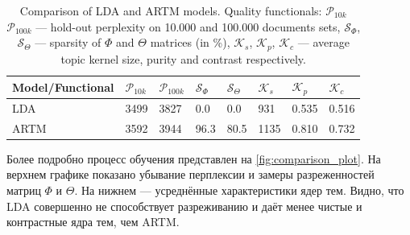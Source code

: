 \documentclass{article}
\begin{document}
\begin{table}[t]
\caption{Comparison of LDA and ARTM models. Quality functionals: $\mathcal{P}_{10k}$ $\mathcal{P}_{100k}$ --- hold-out perplexity on 10.000 and 100.000 documents sets, $\mathcal{S}_{\Phi}$, $\mathcal{S}_{\Theta}$ --- sparsity of $\Phi$ and $\Theta$ matrices (in \%), $\mathcal{K}_{s}$, $\mathcal{K}_{p}$, $\mathcal{K}_{c}$ --- average topic kernel size, purity and contrast respectively.}
\label{tab:model_comparison}
\begin{center}
\renewcommand{\arraystretch}{1.5}
\begin{tabular}[t]{P{10.5em}|P{3.5em} P{3.5em} P{3.5em} P{3.5em} P{3.5em} P{3.5em} P{3.5em} }
\hline
Model/Functional & $\mathcal{P}_{10k}$ & $\mathcal{P}_{100k}$ &  $\mathcal{S}_{\Phi}$ & $\mathcal{S}_{\Theta}$ &  $\mathcal{K}_{s}$ & $\mathcal{K}_{p}$ &  $\mathcal{K}_{c}$ \\
\hline
LDA              & 3499 & 3827 & 0.0  & 0.0  & 931  & 0.535 & 0.516 \\
ARTM             & 3592 & 3944 & 96.3 & 80.5 & 1135 & 0.810 & 0.732 \\
\hline
\end{tabular}
\end{center}
\end{table}

Более подробно процесс обучения представлен на \ref{fig:comparison_plot}. На верхнем графике показано убывание перплексии и замеры разреженностей матриц $\Phi$ и $\Theta$. На нижнем --- усреднённые характеристики ядер тем. Видно, что LDA совершенно не способствует разреживанию и даёт менее чистые и контрастные ядра тем, чем ARTM.
\end{document}
